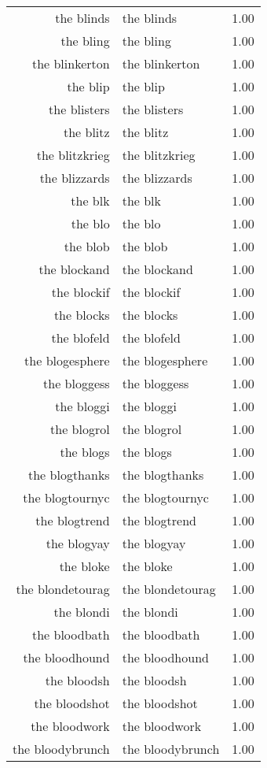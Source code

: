 \begin{table}[ht]
\begin{tabular}{rlr}
  the blinds & the blinds & 1.00 \\ 
  the bling & the bling & 1.00 \\ 
  the blinkerton & the blinkerton & 1.00 \\ 
  the blip & the blip & 1.00 \\ 
  the blisters & the blisters & 1.00 \\ 
  the blitz & the blitz & 1.00 \\ 
  the blitzkrieg & the blitzkrieg & 1.00 \\ 
  the blizzards & the blizzards & 1.00 \\ 
  the blk & the blk & 1.00 \\ 
  the blo & the blo & 1.00 \\ 
  the blob & the blob & 1.00 \\ 
  the blockand & the blockand & 1.00 \\ 
  the blockif & the blockif & 1.00 \\ 
  the blocks & the blocks & 1.00 \\ 
  the blofeld & the blofeld & 1.00 \\ 
  the blogesphere & the blogesphere & 1.00 \\ 
  the bloggess & the bloggess & 1.00 \\ 
  the bloggi & the bloggi & 1.00 \\ 
  the blogrol & the blogrol & 1.00 \\ 
  the blogs & the blogs & 1.00 \\ 
  the blogthanks & the blogthanks & 1.00 \\ 
  the blogtournyc & the blogtournyc & 1.00 \\ 
  the blogtrend & the blogtrend & 1.00 \\ 
  the blogyay & the blogyay & 1.00 \\ 
  the bloke & the bloke & 1.00 \\ 
  the blondetourag & the blondetourag & 1.00 \\ 
  the blondi & the blondi & 1.00 \\ 
  the bloodbath & the bloodbath & 1.00 \\ 
  the bloodhound & the bloodhound & 1.00 \\ 
  the bloodsh & the bloodsh & 1.00 \\ 
  the bloodshot & the bloodshot & 1.00 \\ 
  the bloodwork & the bloodwork & 1.00 \\ 
  the bloodybrunch & the bloodybrunch & 1.00 \\ 

\end{tabular}
\end{table}
